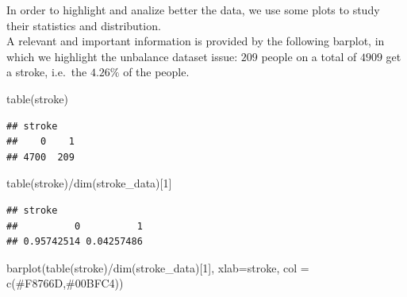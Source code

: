 \documentclass[
]{article}
\newenvironment{Shaded}{\begin{snugshade}}{\end{snugshade}}
\newcommand{\AttributeTok}[1]{\textcolor[rgb]{0.77,0.63,0.00}{#1}}
\newcommand{\DecValTok}[1]{\textcolor[rgb]{0.00,0.00,0.81}{#1}}
\newcommand{\FunctionTok}[1]{\textcolor[rgb]{0.00,0.00,0.00}{#1}}
\newcommand{\NormalTok}[1]{#1}
\newcommand{\SpecialCharTok}[1]{\textcolor[rgb]{0.00,0.00,0.00}{#1}}
\newcommand{\StringTok}[1]{\textcolor[rgb]{0.31,0.60,0.02}{#1}}
\begin{document}
In order to highlight and analize better the data, we use some plots to
study their statistics and distribution.\\
A relevant and important information is provided by the following
barplot, in which we highlight the unbalance dataset issue: \(209\) people on a
total of \(4909\) get a stroke, i.e.~the \(4.26 \%\) of the people.

\begin{Shaded}
\begin{Highlighting}[]
\FunctionTok{table}\NormalTok{(stroke)}
\end{Highlighting}
\end{Shaded}

\begin{verbatim}
## stroke
##    0    1 
## 4700  209
\end{verbatim}

\begin{Shaded}
\begin{Highlighting}[]
\FunctionTok{table}\NormalTok{(stroke)}\SpecialCharTok{/}\FunctionTok{dim}\NormalTok{(stroke\_data)[}\DecValTok{1}\NormalTok{]}
\end{Highlighting}
\end{Shaded}

\begin{verbatim}
## stroke
##          0          1 
## 0.95742514 0.04257486
\end{verbatim}

\begin{Shaded}
\begin{Highlighting}[]
\FunctionTok{barplot}\NormalTok{(}\FunctionTok{table}\NormalTok{(stroke)}\SpecialCharTok{/}\FunctionTok{dim}\NormalTok{(stroke\_data)[}\DecValTok{1}\NormalTok{], }\AttributeTok{xlab=}\StringTok{\textquotesingle{}stroke\textquotesingle{}}\NormalTok{,}
        \AttributeTok{col =} \FunctionTok{c}\NormalTok{(}\StringTok{\textquotesingle{}\#F8766D\textquotesingle{}}\NormalTok{,}\StringTok{\textquotesingle{}\#00BFC4\textquotesingle{}}\NormalTok{))}
\end{Highlighting}
\end{Shaded}
\end{document}
